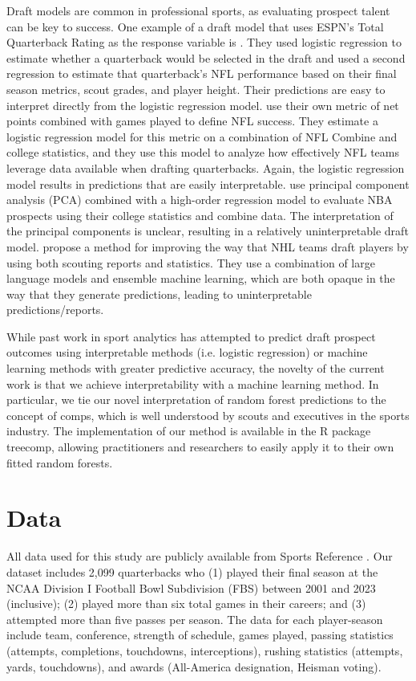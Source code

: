 \documentclass[Review, sageh, times]{sagej}
\begin{document}
Draft models are common in professional sports, as evaluating prospect talent can be key to success. One example of a draft model that uses ESPN's Total Quarterback Rating as the response variable is \citet{craig_predicting_2021}. They used logistic regression to estimate whether a quarterback would be selected in the draft and used a second regression to estimate that quarterback's NFL performance based on their final season metrics, scout grades, and player height. Their predictions are easy to interpret directly from the logistic regression model. \citet{wolfson_quarterback_2011} use their own metric of net points combined with games played to define NFL success. They estimate a logistic regression model for this metric on a combination of NFL Combine and college statistics, and they use this model to analyze how effectively NFL teams leverage data available when drafting quarterbacks. Again, the logistic regression model results in predictions that are easily interpretable. \citet{berger_jumping_2021} use principal component analysis (PCA) combined with a high-order regression model to evaluate NBA prospects using their college statistics and combine data. The interpretation of the principal components is unclear, resulting in a relatively uninterpretable draft model. \citet{luo_improving_2024} propose a method for improving the way that NHL teams draft players by using both scouting reports and statistics. They use a combination of large language models and ensemble machine learning, which are both opaque in the way that they generate predictions, leading to uninterpretable predictions/reports.

While past work in sport analytics has attempted to predict draft prospect outcomes using interpretable methods (i.e. logistic regression) or machine learning methods with greater predictive accuracy, the novelty of the current work is that we achieve interpretability with a machine learning method. In particular, we tie our novel interpretation of random forest predictions to the concept of comps, which is well understood by scouts and executives in the sports industry. The implementation of our method is available in the R package treecomp, allowing practitioners and researchers to easily apply it to their own fitted random forests.

\section{Data}
\label{sec:data}

All data used for this study are publicly available from Sports Reference \citep{sports_reference_sports_2025}. Our dataset includes 2,099 quarterbacks who (1) played their final season at the NCAA Division I Football Bowl Subdivision (FBS) between 2001 and 2023 (inclusive); (2) played more than six total games in their careers; and (3) attempted more than five passes per season. The data for each player-season include team, conference, strength of schedule, games played, passing statistics (attempts, completions, touchdowns, interceptions), rushing statistics (attempts, yards, touchdowns), and awards (All-America designation, Heisman voting).
\end{document}
